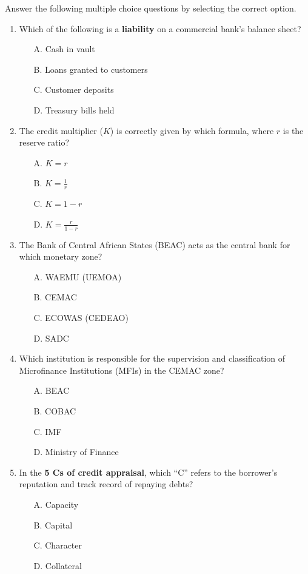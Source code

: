 \documentclass[11pt]{article}
\begin{document}
\begin{exercice}
Answer the following multiple choice questions by selecting the correct option.

\begin{enumerate}
\item Which of the following is a \textbf{liability} on a commercial bank's balance sheet?
\begin{itemize}
\item[A.] Cash in vault
\item[B.] Loans granted to customers
\item[C.] Customer deposits
\item[D.] Treasury bills held
\end{itemize}

\item The credit multiplier ($K$) is correctly given by which formula, where $r$ is the reserve ratio?
\begin{itemize}
\item[A.] $K = r$
\item[B.] $K = \frac{1}{r}$
\item[C.] $K = 1 - r$
\item[D.] $K = \frac{r}{1-r}$
\end{itemize}

\item The Bank of Central African States (BEAC) acts as the central bank for which monetary zone?
\begin{itemize}
\item[A.] WAEMU (UEMOA)
\item[B.] CEMAC
\item[C.] ECOWAS (CEDEAO)
\item[D.] SADC
\end{itemize}

\item Which institution is responsible for the supervision and classification of Microfinance Institutions (MFIs) in the CEMAC zone?
\begin{itemize}
\item[A.] BEAC
\item[B.] COBAC
\item[C.] IMF
\item[D.] Ministry of Finance
\end{itemize}

\item In the \textbf{5 Cs of credit appraisal}, which ``C'' refers to the borrower's reputation and track record of repaying debts?
\begin{itemize}
\item[A.] Capacity
\item[B.] Capital
\item[C.] Character
\item[D.] Collateral
\end{itemize}
\end{enumerate}
\end{exercice}
\end{document}
